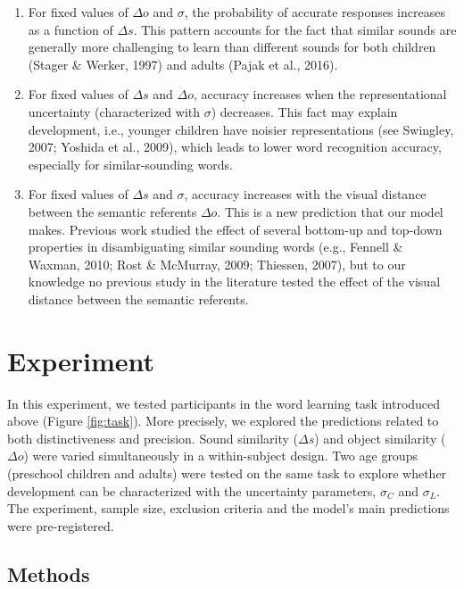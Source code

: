 \documentclass[10pt, letterpaper]{article}
\begin{document}
\begin{enumerate}
\def\labelenumi{\arabic{enumi})}
\item
  For fixed values of \(\Delta o\) and \(\sigma\), the probability of
  accurate responses increases as a function of \(\Delta s\). This
  pattern accounts for the fact that similar sounds are generally more
  challenging to learn than different sounds for both children (Stager
  \& Werker, 1997) and adults (Pajak et al., 2016).
\item
  For fixed values of \(\Delta s\) and \(\Delta o\), accuracy increases
  when the representational uncertainty (characterized with \(\sigma\))
  decreases. This fact may explain development, i.e., younger children
  have noisier representations (see Swingley, 2007; Yoshida et al.,
  2009), which leads to lower word recognition accuracy, especially for
  similar-sounding words.
\item
  For fixed values of \(\Delta s\) and \(\sigma\), accuracy increases
  with the visual distance between the semantic referents \(\Delta o\).
  This is a new prediction that our model makes. Previous work studied
  the effect of several bottom-up and top-down properties in
  disambiguating similar sounding words (e.g., Fennell \& Waxman, 2010;
  Rost \& McMurray, 2009; Thiessen, 2007), but to our knowledge no
  previous study in the literature tested the effect of the visual
  distance between the semantic referents.
\end{enumerate}

\section{Experiment}\label{experiment}

In this experiment, we tested participants in the word learning task
introduced above (Figure \ref{fig:task}). More precisely, we explored
the predictions related to both distinctiveness and precision. Sound
similarity (\(\Delta s\)) and object similarity (\(\Delta o\)) were
varied simultaneously in a within-subject design. Two age groups
(preschool children and adults) were tested on the same task to explore
whether development can be characterized with the uncertainty
parameters, \(\sigma_C\) and \(\sigma_L\). The experiment, sample size,
exclusion criteria and the model's main predictions were pre-registered.

\subsection{Methods}\label{methods}
\end{document}
